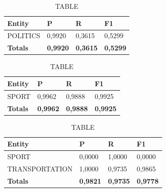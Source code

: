 \documentclass[thesis=M,english]{FITthesis}[2018/05/30]
\begin{document}
	\begin{table}[H]\centering
		\caption{TABLE}
		\label{}
		\begin{tabular}{|l|l|l|l|}
			\hline {\textbf{Entity}} & {\textbf{P}} & {\textbf{R}} & {\textbf{F1}}\\\hline
				POLITICS & 0,9920 & 0,3615 & 0,5299\\\hline
				\textbf{Totals} & \textbf{0,9920} & \textbf{0,3615} & \textbf{0,5299}\\\hline
		\end{tabular}
	\end{table}

	\begin{table}[H]\centering
		\caption{TABLE}
		\label{}
		\begin{tabular}{|l|l|l|l|}
			\hline {\textbf{Entity}} & {\textbf{P}} & {\textbf{R}} & {\textbf{F1}}\\\hline
				SPORT & 0,9962 & 0,9888 & 0,9925\\\hline
				\textbf{Totals} & \textbf{0,9962} & \textbf{0,9888} & \textbf{0,9925}\\\hline
		\end{tabular}
	\end{table}	

	\begin{table}[H]\centering
		\caption{TABLE}
		\label{}
		\begin{tabular}{|l|l|l|l|}
			\hline {\textbf{Entity}} & {\textbf{P}} & {\textbf{R}} & {\textbf{F1}}\\\hline
				SPORT & 0,0000 & 1,0000 & 0,0000\\
				TRANSPORTATION & 1,0000 & 0,9735 & 0,9865\\\hline
				\textbf{Totals} & \textbf{0,9821} & \textbf{0,9735} & \textbf{0,9778}\\\hline
		\end{tabular}
	\end{table}	
		

\end{document}
